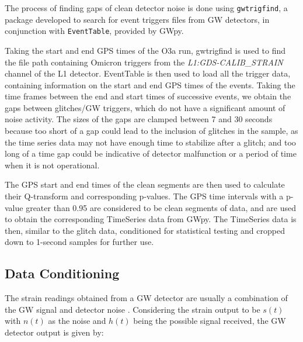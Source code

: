 \documentclass[12pt]{article}
\begin{document}
\noindent The process of finding gaps of clean detector noise is done using \texttt{gwtrigfind}, a package developed to search for event triggers files from GW detectors, in conjunction with \texttt{EventTable}, provided by GWpy.

\medskip
\noindent Taking the start and end GPS times of the O3a run, gwtrigfind is used to find the file path containing Omicron triggers from the \textit{L1:GDS-CALIB\_STRAIN} channel of the L1 detector. EventTable is then used to load all the trigger data, containing information on the start and end GPS times of the events. Taking the time frames between the end and start times of successive events, we obtain the gaps between glitches/GW triggers, which do not have a significant amount of noise activity. The sizes of the gaps are clamped between 7 and 30 seconds because too short of a gap could lead to the inclusion of glitches in the sample, as the time series data may not have enough time to stabilize after a glitch; and too long of a time gap could be indicative of detector malfunction or a period of time when it is not operational.

\medskip
\noindent The GPS start and end times of the clean segments are then used to calculate their Q-transform and corresponding p-values. The GPS time intervals with a p-value greater than 0.95 are considered to be clean segments of data, and are used to obtain the corresponding TimeSeries data from GWpy. The TimeSeries data is then, similar to the glitch data, conditioned for statistical testing and cropped down to 1-second samples for further use.


\subsection{Data Conditioning}\label{DataConditioning}

\noindent The strain readings obtained from a GW detector are usually a combination of the GW signal and detector noise \cite{cutler_gravitational_1994, moore_gravitational-wave_2015, Li:2013lza}. Considering the strain output to be $s(t)$ with $n(t)$ as the noise and $h(t)$ being the possible signal received, the GW detector output is given by:
\end{document}
